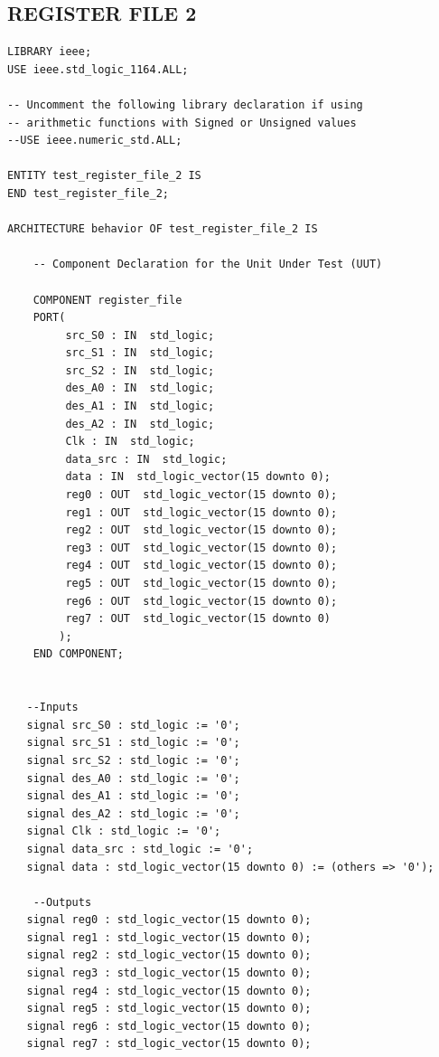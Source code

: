 \documentclass{article}
\begin{document}
\pagebreak

\subsection{REGISTER FILE 2}\label{sec:result}

\begin{lstlisting}
LIBRARY ieee;
USE ieee.std_logic_1164.ALL;
 
-- Uncomment the following library declaration if using
-- arithmetic functions with Signed or Unsigned values
--USE ieee.numeric_std.ALL;
 
ENTITY test_register_file_2 IS
END test_register_file_2;
 
ARCHITECTURE behavior OF test_register_file_2 IS 
 
    -- Component Declaration for the Unit Under Test (UUT)
 
    COMPONENT register_file
    PORT(
         src_S0 : IN  std_logic;
         src_S1 : IN  std_logic;
         src_S2 : IN  std_logic;
         des_A0 : IN  std_logic;
         des_A1 : IN  std_logic;
         des_A2 : IN  std_logic;
         Clk : IN  std_logic;
         data_src : IN  std_logic;
         data : IN  std_logic_vector(15 downto 0);
         reg0 : OUT  std_logic_vector(15 downto 0);
         reg1 : OUT  std_logic_vector(15 downto 0);
         reg2 : OUT  std_logic_vector(15 downto 0);
         reg3 : OUT  std_logic_vector(15 downto 0);
         reg4 : OUT  std_logic_vector(15 downto 0);
         reg5 : OUT  std_logic_vector(15 downto 0);
         reg6 : OUT  std_logic_vector(15 downto 0);
         reg7 : OUT  std_logic_vector(15 downto 0)
        );
    END COMPONENT;
    

   --Inputs
   signal src_S0 : std_logic := '0';
   signal src_S1 : std_logic := '0';
   signal src_S2 : std_logic := '0';
   signal des_A0 : std_logic := '0';
   signal des_A1 : std_logic := '0';
   signal des_A2 : std_logic := '0';
   signal Clk : std_logic := '0';
   signal data_src : std_logic := '0';
   signal data : std_logic_vector(15 downto 0) := (others => '0');

 	--Outputs
   signal reg0 : std_logic_vector(15 downto 0);
   signal reg1 : std_logic_vector(15 downto 0);
   signal reg2 : std_logic_vector(15 downto 0);
   signal reg3 : std_logic_vector(15 downto 0);
   signal reg4 : std_logic_vector(15 downto 0);
   signal reg5 : std_logic_vector(15 downto 0);
   signal reg6 : std_logic_vector(15 downto 0);
   signal reg7 : std_logic_vector(15 downto 0);


\end{lstlisting}
\end{document}
